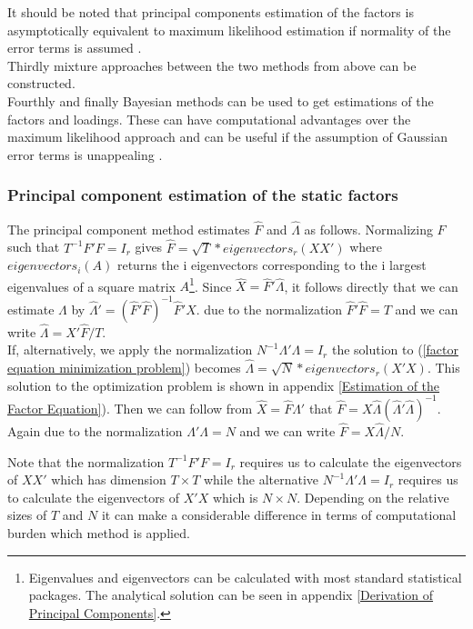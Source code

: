 \documentclass[12pt]{article}
\begin{document}
It should be noted that principal components estimation of the factors is asymptotically equivalent to maximum likelihood estimation if normality of the error terms is assumed \citep{bai2003inferential}. \\
Thirdly mixture approaches between the two methods from above can be constructed. \\
Fourthly and finally Bayesian methods can be used to get estimations of the factors and loadings. These can have computational advantages over the maximum likelihood approach and can be useful if the assumption of Gaussian error terms is unappealing \citep{stock2011dynamic}. \\

\subsubsection{Principal component estimation of the static factors}
The principal component method estimates $\hat F$ and $\hat \Lambda$ as follows. Normalizing $F$ such that $T^{-1}F'F = I_r$ gives $\hat F = \sqrt{T} * eigenvectors_r(XX')$ where $eigenvectors_i(A)$ returns the i eigenvectors corresponding to the i largest eigenvalues of a square matrix $A$\footnote{Eigenvalues and eigenvectors can be calculated with most standard statistical packages. The analytical solution can be seen in appendix \ref{Derivation of Principal Components}.}. Since $\hat X = \hat F' \hat \Lambda$, it follows directly that we can estimate $\Lambda$ by $\hat \Lambda' = (\hat F' \hat F)^{-1} \hat F'X$. due to the normalization $\hat F' \hat F = T$ and we can write $\hat \Lambda = X' \hat F / T$. \\
If, alternatively, we apply the normalization $N^{-1}\Lambda'\Lambda = I_r$ the solution to (\ref{factor equation minimization problem}) becomes $\hat \Lambda = \sqrt{N} * eigenvectors_r(X'X)$. This solution to the optimization problem is shown in appendix \ref{Estimation of the Factor Equation}). Then we can follow from $\hat X = \hat F \hat \Lambda'$ that $\hat F = X \hat \Lambda (\hat \Lambda' \hat \Lambda)^{-1}$. Again due to the normalization $\Lambda' \Lambda = N$ and we can write $\hat F = X \hat \Lambda / N$.

Note that the normalization $T^{-1}F'F = I_r$ requires us to calculate the eigenvectors of $XX'$ which has dimension $T \times T$ while the alternative $N^{-1}\Lambda'\Lambda = I_r$ requires us to calculate the eigenvectors of $X'X$ which is $N \times N$. Depending on the relative sizes of $T$ and $N$ it can make a considerable difference in terms of computational burden which method is applied. \\
\end{document}
